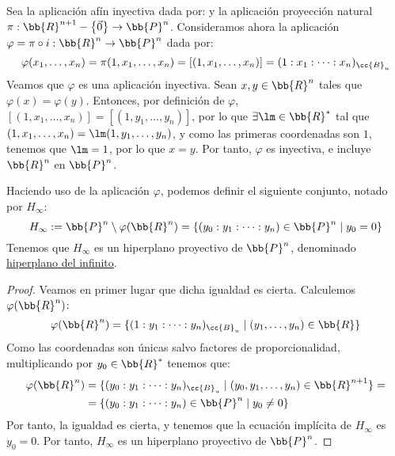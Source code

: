 Sea la aplicación afín inyectiva dada por:
y la aplicación proyección natural $\pi:\bb{R}^{n+1}-\left\{\vec{0}\right\}\to \bb{P}^n$.
Consideramos ahora la aplicación $\varphi = \pi \circ i:\bb{R}^n \to \bb{P}^n$ dada por:
\begin{equation*}
    \varphi(x_1,\dots,x_n) = \pi(1,x_1,\dots,x_n) = [(1,x_1,\dots,x_n)] =
    (1:x_1:\dots:x_n)_{\cc{B}_u}
\end{equation*}
Veamos que $\varphi$ es una aplicación inyectiva. Sean $x,y \in \bb{R}^n$ tales que $\varphi(x)=\varphi(y)$.
Entonces, por definición de $\varphi$, $[(1,x_1,\dots,x_n)] = [(1,y_1,\dots,y_n)]$, por lo que $\exists \lm \in \bb{R}^\ast$ tal que
$(1,x_1,\dots,x_n) = \lm (1,y_1,\dots,y_n)$, y como las primeras coordenadas son $1$, tenemos que $\lm =1$, por lo que $x=y$.
Por tanto, $\varphi$ es inyectiva, e incluye $\bb{R}^n$ en $\bb{P}^n$.

\begin{prop}
    Haciendo uso de la aplicación $\varphi$, podemos definir el siguiente conjunto, notado por $H_{\infty}$:
    \begin{equation*}
        H_{\infty} := \bb{P}^n \setminus \varphi(\bb{R}^n) = \{(y_0:y_1:\dots :y_n) \in \bb{P}^n \mid y_0 = 0\}
    \end{equation*}
    Tenemos que $H_{\infty}$ es un hiperplano proyectivo de $\bb{P}^n$, denominado \ul{hiperplano del infinito}.
\end{prop}
\begin{proof}
    Veamos en primer lugar que dicha igualdad es cierta. Calculemos $\varphi(\bb{R}^n)$:
    \begin{equation*}
        \varphi(\bb{R}^n) = \{(1:y_1:\dots:y_n)_{\cc{B}_u} \mid (y_1,\dots,y_n) \in \bb{R}\}
    \end{equation*}
    Como las coordenadas son únicas salvo factores de proporcionalidad, multiplicando por $y_0 \in \bb{R}^\ast$ tenemos que:
    \begin{align*}
        \varphi(\bb{R}^n) &= \{(y_0:y_1:\dots:y_n)_{\cc{B}_u} \mid (y_0,y_1,\dots,y_n) \in \bb{R}^{n+1}\} =\\
        &= \{(y_0:y_1:\dots:y_n) \in \bb{P}^n \mid y_0 \neq 0\}
    \end{align*}
    Por tanto, la igualdad es cierta, y tenemos que la ecuación implícita de $H_{\infty}$ es $y_0=0$.
    Por tanto, $H_{\infty}$ es un hiperplano proyectivo de $\bb{P}^n$.
\end{proof}

